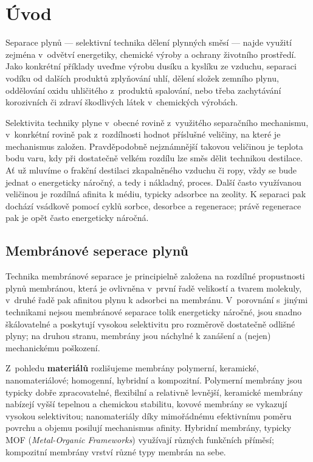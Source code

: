 \section{Úvod}
\par Separace plynů --- selektivní technika dělení plynných směsí --- najde využití zejména v~odvětví energetiky, chemické výroby a ochrany životního prostředí. Jako konkrétní příklady uveďme výrobu dusíku a kyslíku ze vzduchu, separaci vodíku od dalších produktů zplyňování uhlí, dělení složek zemního plynu, oddělování oxidu uhličitého z~produktů spalování, nebo třeba zachytávání korozivních či zdraví škodlivých látek v~chemických výrobách.

\par Selektivita techniky plyne v~obecné rovině z~využitého separačního mechanismu, v~konrkétní rovině pak z~rozdílnosti hodnot příslušné veličiny, na které je mechanismus založen. Pravděpodobně nejznámnější takovou veličinou je teplota bodu varu, kdy při dostatečně velkém rozdílu lze směs dělit technikou destilace. Ať už mluvíme o frakční destilaci zkapalněného vzduchu či ropy, vždy se bude jednat o energeticky náročný, a tedy i nákladný, proces. Další často využívanou veličinou je rozdílná afinita k médiu, typicky adsorbce na zeolity. K separaci pak dochází vsádkově pomocí cyklů sorbce, desorbce a regenerace; právě regenerace pak je opět často energeticky náročná.

\subsection{Membránové seperace plynů}
\par Technika membránové separace je principielně založena na rozdílné propustnosti plynů membránou, která je ovlivněna v~první řadě velikostí a tvarem molekuly, v~druhé řadě pak afinitou plynu k adsorbci na membránu. V~porovnání s~jinými technikami nejsou membránové separace tolik energeticky náročné, jsou snadno škálovatelné a poskytují vysokou selektivitu pro rozměrově dostatečně odlišné plyny; na druhou stranu, membrány jsou náchylné k zanášení a (nejen) mechanickému poškození. 

\par Z~pohledu \textbf{materiálů} rozlišujeme membrány polymerní, keramické, nanomateriálové; homogenní, hybridní a kompozitní. Polymerní membrány jsou typicky dobře zpracovatelné, flexibilní a relativně levnější, keramické membrány nabízejí vyšší tepelnou a chemickou stabilitu, kovové membrány se vykazují vysokou selektivitou; nanomateriály díky mimořádnému efektivnímu poměru povrchu a objemu posilují mechanismus afinity. Hybridní membrány, typicky MOF (\textit{Metal-Organic Frameworks}) využívají různých funkčních příměsí; kompozitní membrány vrství různé typy membrán na sebe. 

